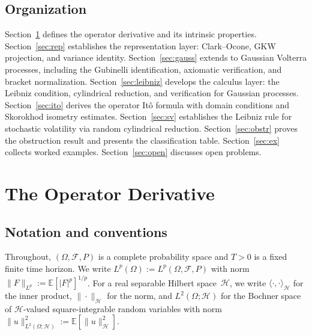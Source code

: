 \documentclass[11pt,a4paper]{article}
\theoremstyle{plain}
\theoremstyle{definition}
\theoremstyle{remark}
\newcommand{\E}{\mathbb{E}}
\begin{document}
\subsection{Organization}

Section~\ref{sec:opderiv} defines the operator derivative and its intrinsic properties. Section~\ref{sec:rep} establishes the representation layer: Clark--Ocone, GKW projection, and variance identity. Section~\ref{sec:gauss} extends to Gaussian Volterra processes, including the Gubinelli identification, axiomatic verification, and bracket normalization. Section~\ref{sec:leibniz} develops the calculus layer: the Leibniz condition, cylindrical reduction, and verification for Gaussian processes. Section~\ref{sec:ito} derives the operator It\^o formula with domain conditions and Skorokhod isometry estimates. Section~\ref{sec:sv} establishes the Leibniz rule for stochastic volatility via random cylindrical reduction. Section~\ref{sec:obstr} proves the obstruction result and presents the classification table. Section~\ref{sec:ex} collects worked examples. Section~\ref{sec:open} discusses open problems.


\section{The Operator Derivative}\label{sec:opderiv}

\subsection{Notation and conventions}

Throughout, $(\Omega, \mathcal{F}, P)$ is a complete probability space and $T > 0$ is a fixed finite time horizon. We write $L^p(\Omega) := L^p(\Omega, \mathcal{F}, P)$ with norm $\|F\|_{L^p} := \E[|F|^p]^{1/p}$. For a real separable Hilbert space~$\mathcal{H}$, we write $\langle\cdot,\cdot\rangle_{\mathcal{H}}$ for the inner product, $\|\cdot\|_{\mathcal{H}}$ for the norm, and $L^2(\Omega;\mathcal{H})$ for the Bochner space of $\mathcal{H}$-valued square-integrable random variables with norm $\|u\|^2_{L^2(\Omega;\mathcal{H})} := \E[\|u\|^2_{\mathcal{H}}]$.
\end{document}

